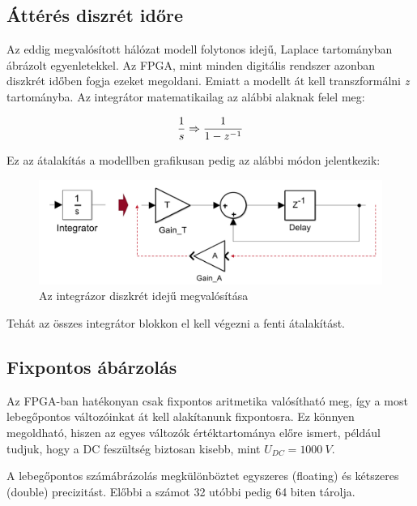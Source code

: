 \subsection{Áttérés diszrét időre}

Az eddig megvalósított hálózat modell folytonos idejű, Laplace tartományban ábrázolt egyenletekkel. Az FPGA, mint minden digitális rendszer azonban diszkrét időben fogja ezeket megoldani. Emiatt a modellt át kell transzformálni \emph{z} tartományba. Az integrátor matematikailag az alábbi alaknak felel meg:

\begin{equation}
\centering
\frac{1}{s} \Rightarrow \frac{1}{1-z^{-1}}
\end{equation}

Ez az átalakítás a modellben grafikusan pedig az alábbi módon jelentkezik:

\begin{figure}[h]
	\centering
	\includegraphics[width = \textwidth]{figures/integrator.png}
	\caption{Az integrázor diszkrét idejű megvalósítása} 
	\label{fig:integrator}
\end{figure}

Tehát az összes integrátor blokkon el kell végezni a fenti átalakítást.


\subsection{Fixpontos ábárzolás}

Az FPGA-ban hatékonyan csak fixpontos aritmetika valósítható meg, így a most lebegőpontos változóinkat át kell alakítanunk fixpontosra. Ez könnyen megoldható, hiszen az egyes változók értéktartománya előre ismert, például tudjuk, hogy a DC feszültség biztosan kisebb, mint $U_{DC}=1000\ V$.

A lebegőpontos számábrázolás megkülönböztet egyszeres (floating) és kétszeres (double) precizitást. Előbbi a számot 32 utóbbi pedig 64 biten tárolja.

